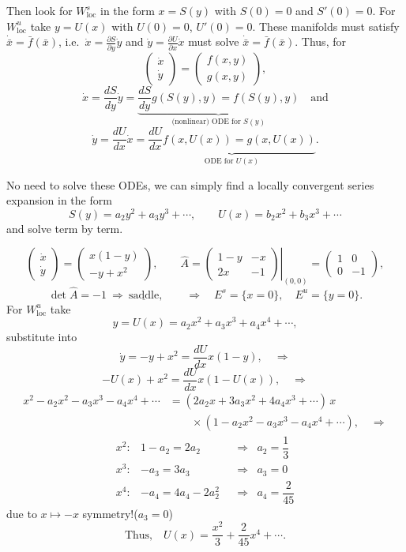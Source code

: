 \documentclass[11pt,a4paper]{article}
\begin{document}
\medskip
\noindent
Then look for $W^s_{\mathrm{loc}}$ in the form $x=S(y)$ with $S(0)=0$ and
$S'(0)=0$. For $W^u_{\mathrm{loc}}$ take $y=U(x)$ with $U(0)=0$, $U'(0)=0$.
These manifolds must satisfy $\dot{\bar x}=\bar f(\bar x)$, i.e.\
$\dot x=\frac{\partial S}{\partial y}\dot y$ and
$\dot y=\frac{\partial U}{\partial x}\dot x$ must solve
$\dot{\bar x}=\bar f(\bar x)$. Thus, for
\[
\begin{pmatrix}\dot x\\\dot y\end{pmatrix}
=\begin{pmatrix}f(x,y)\\g(x,y)\end{pmatrix},
\]
\[
\dot x=\frac{dS}{dy}\dot y=
\underbrace{\frac{dS}{dy}g(S(y),y)=f(S(y),y)}_{\text{(nonlinear) ODE for }S(y)}
\quad\text{and}
\]
\[
\dot y=\frac{dU}{dx}\dot x=
\underbrace{\frac{dU}{dx}f(x,U(x))=g(x,U(x))}_{\text{ODE for }U(x)}.
\]

\newpage
\noindent
No need to solve these ODEs, we can simply find a locally convergent series
expansion in the form
\[
S(y)=a_2y^2+a_3y^3+\cdots,\qquad U(x)=b_2x^2+b_3x^3+\cdots
\]
\noindent and solve term by term.

\medskip
\noindent{}
\[
\begin{pmatrix}\dot x\\\dot y\end{pmatrix}
=\begin{pmatrix}x(1-y)\\-y+x^2\end{pmatrix},\qquad
\hat A=\left.\begin{pmatrix}1-y&-x\\2x&-1\end{pmatrix}\right|_{(0,0)}
=\begin{pmatrix}1&0\\0&-1\end{pmatrix},
\]
\[
\det\hat A=-1\ \Rightarrow\ \underline{\text{saddle}},\qquad
\Rightarrow\quad E^s=\{x=0\},\quad E^u=\{y=0\}.
\]
\noindent For $W^u_{\mathrm{loc}}$ take
\[
y=U(x)=a_2x^2+a_3x^3+a_4x^4+\cdots,
\]
\noindent substitute into
\[
\dot y=-y+x^2=\frac{dU}{dx}x(1-y),\quad\Rightarrow
\]
\[
-U(x)+x^2=\frac{dU}{dx}x(1-U(x)),\quad\Rightarrow
\]
\[
\begin{aligned}
x^2-a_2x^2-a_3x^3-a_4x^4+\cdots
&=(2a_2x+3a_3x^2+4a_4x^3+\cdots)\,x\\
&\qquad\times(1-a_2x^2-a_3x^3-a_4x^4+\cdots),\quad\Rightarrow
\end{aligned}
\]
\[
\begin{array}{rclcl}
x^2:&1-a_2=2a_2&&\Rightarrow&a_2=\dfrac13\\[5pt]
x^3:&-a_3=3a_3&&\Rightarrow&a_3=0\\[5pt]
x^4:&-a_4=4a_4-2a_2^2&&\Rightarrow&a_4=\dfrac{2}{45}
\end{array}
\]
\hfill due to $x\mapsto-x$ symmetry!\quad ($a_3=0$)
\[
\text{Thus,}\quad U(x)=\frac{x^2}{3}+\frac{2}{45}x^4+\cdots.
\]
\end{document}
